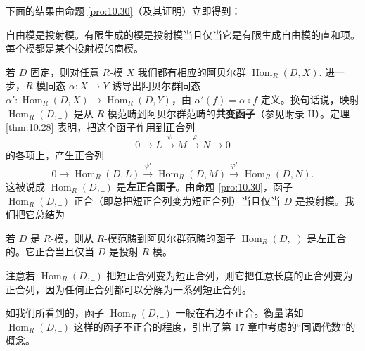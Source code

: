 下面的结果由命题 \ref{pro:10.30}（及其证明）立即得到：

\begin{corollary}\label{cor:10.31}
自由模是投射模。有限生成的模是投射模当且仅当它是有限生成自由模的直和项。每个模都是某个投射模的商模。
\end{corollary}

若 \(D\) 固定，则对任意 \(R\)-模 \(X\) 我们都有相应的阿贝尔群 \(\operatorname{Hom}_R(D, X)\). 进一步，\(R\)-模同态 \(\alpha : X \to Y\) 诱导出阿贝尔群同态 \(\alpha' : \operatorname{Hom}_R(D, X) \to \operatorname{Hom}_R(D, Y)\)，由 \(\alpha'(f) = \alpha \circ f\) 定义。换句话说，映射 \(\operatorname{Hom}_R(D, \_)\) 是从 \(R\)-模范畴到阿贝尔群范畴的\textbf{共变函子}（参见附录 II）。定理 \ref{thm:10.28} 表明，把这个函子作用到正合列
\[
0 \longrightarrow L \xrightarrow{\ \psi\ } M \xrightarrow{\ \varphi\ } N \longrightarrow 0
\]
的各项上，产生正合列
\[
0 \longrightarrow \operatorname{Hom}_R(D, L) \xrightarrow{\ \psi'\ } \operatorname{Hom}_R(D, M) \xrightarrow{\ \varphi'\ } \operatorname{Hom}_R(D, N).
\]
这被说成 \(\operatorname{Hom}_R(D, \_)\) 是\textbf{左正合函子}。由命题 \ref{pro:10.30}，函子 \(\operatorname{Hom}_R(D, \_)\) 正合（即总把短正合列变为短正合列）当且仅当 \(D\) 是投射模。我们把它总结为

\begin{corollary}\label{cor:10.32}
若 \(D\) 是 \(R\)-模，则从 \(R\)-模范畴到阿贝尔群范畴的函子 \(\operatorname{Hom}_R(D, \_)\) 是左正合的。它正合当且仅当 \(D\) 是投射 \(R\)-模。
\end{corollary}

注意若 \(\operatorname{Hom}_R(D, \_)\) 把短正合列变为短正合列，则它把任意长度的正合列变为正合列，因为任何正合列都可以分解为一系列短正合列。

如我们所看到的，函子 \(\operatorname{Hom}_R(D, \_)\) 一般在右边不正合。衡量诸如 \(\operatorname{Hom}_R(D, \_)\) 这样的函子不正合的程度，引出了第 17 章中考虑的“同调代数”的概念。

